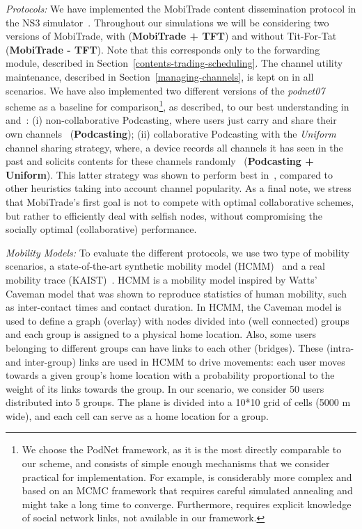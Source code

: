 \emph{Protocols:} We have implemented the MobiTrade content dissemination protocol in the NS3 simulator~\cite{NS3}. Throughout our simulations we will be considering two versions of MobiTrade, with (\textbf{MobiTrade + TFT}) and without Tit-For-Tat (\textbf{MobiTrade - TFT}). Note that this corresponds only to the forwarding module, described in Section~\ref{contents-trading-scheduling}. The channel utility maintenance, described in Section~\ref{managing-channels}, is kept on in all scenarios. We have also implemented two different versions of the \emph{podnet07} scheme as a baseline for comparison\footnote{We choose the PodNet framework, as it is the most directly comparable to our scheme, and consists of simple enough mechanisms that we consider practical for implementation. For example, \cite{OptimalChannelChoice} is considerably more complex and based on an MCMC framework that requires careful simulated annealing and might take a long time to converge. Furthermore, \cite{ContentPlace} requires explicit knowledge of social network links, not available in our framework.},  as described, to our best understanding in~\cite{May07wirelessopportunistic} and~\cite{Podcasting:Secon07}: (i) non-collaborative Podcasting, where users just carry and share their own channels~\cite{May07wirelessopportunistic} (\textbf{Podcasting}); (ii) collaborative Podcasting with the \emph{Uniform} channel sharing strategy, where, a device records all channels it has seen in the past and solicits contents for these channels randomly~\cite{Podcasting:Secon07} (\textbf{Podcasting + Uniform}). This latter strategy was shown to perform best in~\cite{Podcasting:Secon07}, compared to other heuristics taking into account channel popularity. As a final note, we stress that MobiTrade's first goal is not to compete with optimal collaborative schemes, but rather to efficiently deal with selfish nodes, without compromising the socially optimal (collaborative) performance.

\emph{Mobility Models:} To evaluate the different protocols, we use two type of mobility scenarios, a state-of-the-art synthetic mobility model (HCMM)~\cite{HCMM} and a real mobility trace (KAIST)~\cite{KAIST}. HCMM is a mobility model inspired by Watts' Caveman model that was shown to reproduce statistics of human mobility, such as inter-contact times and contact duration. In HCMM, the Caveman model is used to define a graph (overlay) with nodes divided into (well connected) groups and each group is assigned to a physical home location. Also, some users belonging to different groups can have links to each other (bridges). These (intra- and inter-group) links are used in HCMM to drive movements: each user moves towards a given group's home location with a probability
proportional to the weight of its links towards the group. In our scenario, we consider 50 users distributed into 5 groups. The plane is divided into a 10*10 grid of cells (5000 m wide), and each cell can serve as a home location for a group.

